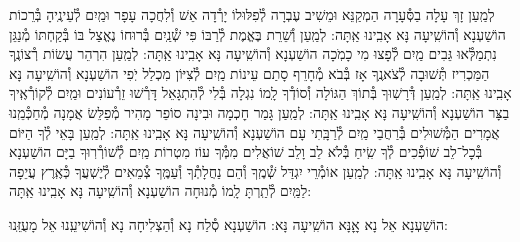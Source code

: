 \documentclass[twoside, openany, parskip=half, 11pt]{book}
\begin{document}
\begin{small}
לְמַֽעַן זָךְ עָלָה בַסְּ֯עָרָה הַמְקַנֵּא וּמֵשִׁיב עֶבְרָה
לְ֯פִלּוּלוֹ יָרְ֯דָה אֵשׁ וְ֯לִחֲכָה עָפָר וּמַֽיִם לְ֯עֵינֶֽיהָ בְּ֯רֵכוֹת הוֹשַׁעְנָא וְ֯הוֹשִֽׁיעָה נָּא אָבִֽינוּ אַֽתָּה:
לְמַֽעַן וְ֯שֵׁרֵת בֶּאֱמֶת לְ֯רַבּוֹ פִּי שְׁ֯נַֽיִם בְּ֯רוּחוֹ נֶאֱצַל בּוֹ
בְּ֯קַחְתּוֹ מְ֯נַגֵּן נִתְמַלְּ֯אוּ גֵּבִים מַֽיִם לְ֯פָצוּ מִי כָמֹֽכָה הוֹשַׁעְנָא וְ֯הוֹשִֽׁיעָה נָּא אָבִֽינוּ אַֽתָּה:
לְמַֽעַן הִרְהֵר עֲשׂוֹת רְ֯צוֹנֶֽךָ הַמַּכְרִיז תְּ֯שׁוּבָה לְ֯צֹאנֶֽךָ
אָז בְּ֯בֹא מְ֯חָרֵף סָתַם עֵינוֹת מַֽיִם לְ֯צִיּוֹן מִכְלַל יֹֽפִי הוֹשַׁעְנָא וְ֯הוֹשִֽׁיעָה נָּא אָבִֽינוּ אַֽתָּה:
לְמַֽעַן דְּ֯רָשֽׁוּךָ בְּ֯תוֹךְ הַגּוֹלָה וְ֯סוֹדְ֯ךָ לָֽמוֹ נִגְלָה
בְּ֯לִי לְ֯הִתְגָּאֵל דָּרְ֯שׁוּ זֵרְ֯עוֹנִים וּמַֽיִם לְ֯קוֹרְ֯אֶֽיךָ בַצָּר הוֹשַׁעְנָא וְ֯הוֹשִֽׁיעָה נָּא אָבִֽינוּ אַֽתָּה:
לְמַֽעַן גָּמַר חׇכְמָה וּבִינָה סוֹפֵר מָהִיר מְ֯פַלֵּשׂ אֲמָנָה
מְ֯חַכְּ֯מֵֽנוּ אֲמָרִים הַמְּ֯שׁוּלִים בְּ֯רַחֲבֵי מַֽיִם לְ֯רַבָּֽתִי עָם הוֹשַׁעְנָא וְ֯הוֹשִֽׁיעָה נָּא אָבִֽינוּ אַֽתָּה:
לְמַֽעַן בָּאֵי לְ֯ךָ הַיּוֹם בְּ֯כׇל־לֵב שׁוֹפְ֯כִים לְ֯ךָ שִֽׂיחַ בְּ֯לֹא לֵב וָלֵב
שׁוֹאֲלִים מִמְּ֯ךָ עוֹז מִטְרוֹת מַֽיִם לְ֯שׁוֹרְ֯רֽוּךָ בַיָּם הוֹשַׁעְנָא וְ֯הוֹשִֽׁיעָה נָּא אָבִֽינוּ אַֽתָּה:
לְמַֽעַן אוֹמְ֯רֵי יִגְדַּל שְׁ֯מֶֽךָ וְ֯הֵם נַחֲלָתְ֯ךָ וְ֯עַמֶּֽךָ
צְ֯מֵאִים לְ֯יֶשְׁעֲךָ כְּ֯אֶֽרֶץ עֲיֵפָה לַמַּֽיִם לְ֯תַֽרְתָּ לָֽמוֹ מְ֯נוּחָה הוֹשַׁעְנָא וְ֯הוֹשִֽׁיעָה נָּא אָבִֽינוּ אַֽתָּה:

\end{small}

\begin{large}
\shatzvkahal
הוֹשַׁעְנָא אֵל נָא אׇׇנָּא הוֹשִֽׁיעָה נָּא:
הוֹשַׁעְנָא סְ֯לַח נָא וְ֯הַצְלִיחָה נָא וְ֯הוֹשִׁיעֵֽנוּ אֵל מָעֻזֵּֽנוּ:

\end{large}
\end{document}
